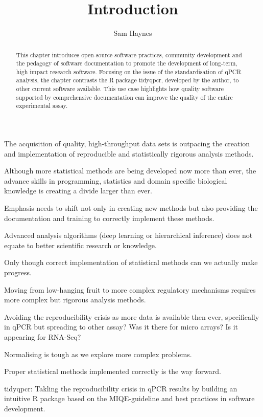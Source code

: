 \documentclass{SBCbookchapter}
\author{Sam Haynes}
\title{Introduction}
\begin{document}
\maketitle

\begin{abstract}
This chapter introduces open-source software practices, community development and the pedagogy of software documentation to promote the development of long-term, high impact research software. Focusing on the issue of the standardisation of qPCR analysis, the chapter contrasts the R package tidyqpcr, developed by the author, to other current software available. This use case highlights how quality software supported by comprehensive documentation can improve the quality of the entire experimental assay.


\end{abstract}

The acquisition of quality, high-throughput data sets is outpacing the creation and implementation of reproducible and statistically rigorous analysis methods. 

Although more statistical methods are being developed now more than ever, the advance skills in programming, statistics and domain specific biological knowledge is creating a divide larger than ever.

Emphasis needs to shift not only in creating new methods but also providing the documentation and training to correctly implement these methods.

Advanced analysis algorithms (deep learning or hierarchical inference) does not equate to better scientific research or knowledge.

Only though correct implementation of statistical methods can we actually make progress.

Moving from low-hanging fruit to more complex regulatory mechanisms requires more complex but rigorous analysis methods.

Avoiding the reproducibility crisis as more data is available then ever, specifically in qPCR but spreading to other assay? Was it there for micro arrays? Is it appearing for RNA-Seq?

Normalising is tough as we explore more complex problems.

Proper statistical methods implemented correctly is the way forward.

tidyqpcr: Takling the reproducibility crisis in qPCR results by building an intuitive R package based on the MIQE-guideline and best practices in software development.
\end{document}
